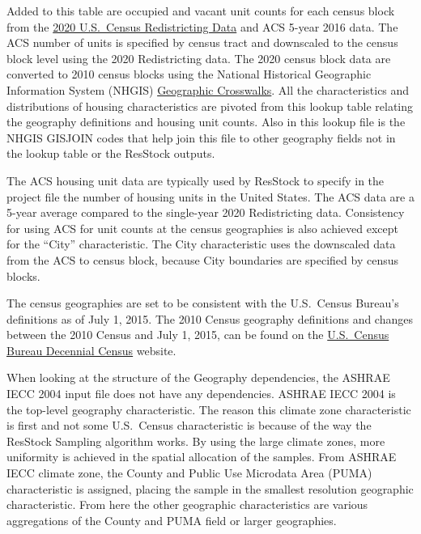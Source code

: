 Added to this table are occupied and vacant unit counts for each census block from the \href{https://www.census.gov/programs-surveys/decennial-census/about/rdo.html}{2020 U.S.~Census Redistricting Data} and ACS 5-year 2016 data. The ACS number of units is specified by census tract and downscaled to the census block level using the 2020 Redistricting data. The 2020 census block data are converted to 2010 census blocks using the National Historical Geographic Information System (NHGIS) \href{https://www.nhgis.org/geographic-crosswalks}{Geographic Crosswalks}. All the characteristics and distributions of housing characteristics are pivoted from this lookup table relating the geography definitions and housing unit counts. Also in this lookup file is the NHGIS GISJOIN codes that help join this file to other geography fields not in the lookup table or the ResStock outputs.

The ACS housing unit data are typically used by ResStock to specify in the project file the number of housing units in the United States. The ACS data are a 5-year average compared to the single-year 2020 Redistricting data. Consistency for using ACS for unit counts at the census geographies is also achieved except for the ``City'' characteristic. The City characteristic uses the downscaled data from the ACS to census block, because City boundaries are specified by census blocks.

The census geographies are set to be consistent with the U.S.~Census Bureau's definitions as of July 1, 2015. The 2010 Census geography definitions and changes between the 2010 Census and July 1, 2015, can be found on the \href{https://www.census.gov/programs-surveys/decennial-census/decade.html}{U.S.~Census Bureau Decennial Census} website.

When looking at the structure of the Geography dependencies, the ASHRAE IECC 2004 input file does not have any dependencies. ASHRAE IECC 2004 is the top-level geography characteristic. The reason this climate zone characteristic is first and not some U.S.~Census characteristic is because of the way the ResStock Sampling algorithm works. By using the large climate zones, more uniformity is achieved in the spatial allocation of the samples. From ASHRAE IECC climate zone, the County and Public Use Microdata Area (PUMA) characteristic is assigned, placing the sample in the smallest resolution geographic characteristic. From here the other geographic characteristics are various aggregations of the County and PUMA field or larger geographies.

